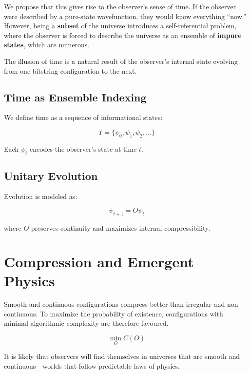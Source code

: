 \documentclass[11pt]{article}
\begin{document}
We propose that this gives rise to the observer's sense of time. If the observer were described by a pure-state wavefunction, they would know everything ``now.'' However, being a \textbf{subset} of the universe introduces a self-referential problem, where the observer is forced to describe the universe as an ensemble of \textbf{impure states}, which are numerous.

The illusion of time is a natural result of the observer’s internal state evolving from one bitstring configuration to the next.


\subsection*{Time as Ensemble Indexing}

We define time as a sequence of informational states:

\[
      T = \{ \psi_0, \psi_1, \psi_2, \ldots \}
\]

Each \(\psi_t\) encodes the observer’s state at time \(t\).

\subsection*{Unitary Evolution}

Evolution is modeled as:

\[
      \psi_{t+1} = O \psi_t
\]

where \(O\) preserves continuity and maximizes internal compressibility.


\section{Compression and Emergent Physics}

Smooth and continuous configurations compress better than irregular and non-continuous. To maximize the probability of existence, configurations with minimal algorithmic complexity are therefore favoured.

\[
      \min_O C(O)
\]

It is likely that observers will find themselves in universes that are smooth and continuous—worlds that follow predictable laws of physics.

\printbibliography
\end{document}
